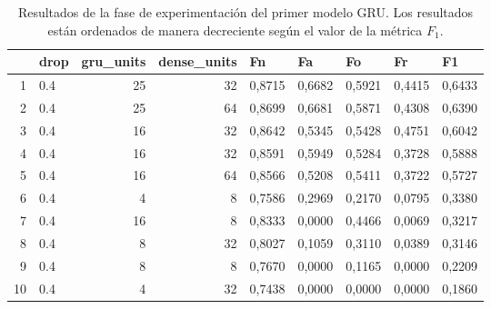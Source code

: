     \begin{table}[htbp]
        \caption{Resultados de la fase de experimentación del primer modelo GRU. Los resultados están ordenados de manera decreciente según el valor de la métrica $F_1$.}
        \begin{center}
        \begin{tabular}{|r|l|r|r|r|r|r|r|r|}
        \hline
        \multicolumn{1}{|l|}{} & \textbf{drop} & \multicolumn{1}{l|}{\textbf{gru\_units}} & \multicolumn{1}{l|}{\textbf{dense\_units}} & \multicolumn{1}{l|}{\textbf{Fn}} & \multicolumn{1}{l|}{\textbf{Fa}} & \multicolumn{1}{l|}{\textbf{Fo}} & \multicolumn{1}{l|}{\textbf{Fr}} & \multicolumn{1}{l|}{\textbf{F1}} \\ \hline
        1 & 0.4 & 25 & 32 & 0,8715 & 0,6682 & 0,5921 & 0,4415 & 0,6433 \\ \hline
        2 & 0.4 & 25 & 64 & 0,8699 & 0,6681 & 0,5871 & 0,4308 & 0,6390 \\ \hline
        3 & 0.4 & 16 & 32 & 0,8642 & 0,5345 & 0,5428 & 0,4751 & 0,6042 \\ \hline
        4 & 0.4 & 16 & 32 & 0,8591 & 0,5949 & 0,5284 & 0,3728 & 0,5888 \\ \hline
        5 & 0.4 & 16 & 64 & 0,8566 & 0,5208 & 0,5411 & 0,3722 & 0,5727 \\ \hline
        6 & 0.4 & 4 & 8 & 0,7586 & 0,2969 & 0,2170 & 0,0795 & 0,3380 \\ \hline
        7 & 0.4 & 16 & 8 & 0,8333 & 0,0000 & 0,4466 & 0,0069 & 0,3217 \\ \hline
        8 & 0.4 & 8 & 32 & 0,8027 & 0,1059 & 0,3110 & 0,0389 & 0,3146 \\ \hline
        9 & 0.4 & 8 & 8 & 0,7670 & 0,0000 & 0,1165 & 0,0000 & 0,2209 \\ \hline
        10 & 0.4 & 4 & 32 & 0,7438 & 0,0000 & 0,0000 & 0,0000 & 0,1860 \\ \hline
        \end{tabular}
        \end{center}
        \label{table:model3_result}
        \end{table}
    

